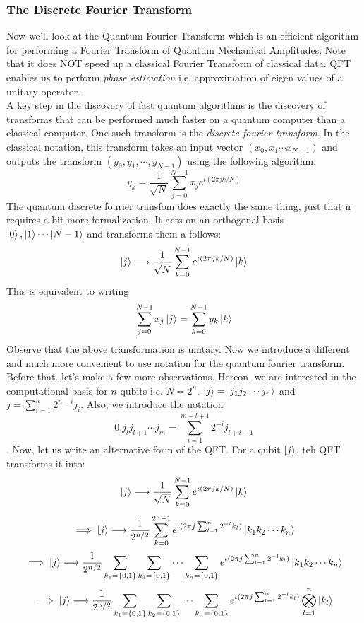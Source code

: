 \documentclass{article}
\begin{document}
\subsubsection{The Discrete Fourier Transform}
Now we'll look at the Quantum Fourier Transform which is an efficient algorithm for performing a Fourier Transform of Quantum Mechanical Amplitudes. Note that it does NOT speed up a classical Fourier Transform of classical data. QFT enables us to perform \emph{phase estimation} i.e. approximation of eigen values of a unitary operator.\\[4pt]
A key step in the discovery of fast quantum algorithms is the discovery of transforms that can be performed much faster on a quantum computer than a classical computer. One such transform is the \emph{discrete fourier transform}. In the classical notation, this transform takes an input vector $(x_0, x_1 \cdots x_{N-1})$ and outputs the transform $(y_0, y_1, \cdots, y_{N-1})$ using the following algorithm:$$y_k = \frac{1}{\sqrt{N}}\sum_{j=0}^{N-1}x_j e^{\iota(2\pi jk/N)}$$
The quantum discrete fourier transfom does exactly the same thing, just that ir requires a bit more formalization. It acts on an orthogonal basis $\ket{0}, \ket{1} \cdots \ket{N-1}$ and transforms them a follows:
$$\ket{j} \longrightarrow  \frac{1}{\sqrt{N}}\sum_{k=0}^{N-1}e^{\iota(2\pi jk/N)}\ket{k}$$
This is equivalent to writing $$\sum_{j=0}^{N-1}x_j\ket{j} = \sum_{k=0}^{N-1}y_k\ket{k}$$
Observe that the above transformation is unitary. Now we introduce a different and much more convenient to use notation for the quantum fourier transform. Before that. let's make a few more observations. Hereon, we are interested in the computational basis for $n$ qubits i.e. $N=2^n$. $\ket{j} = \ket{j_1j_2 \cdots j_n}$ and $j = \sum_{i=1}^n 2^{n-i}j_i$. Also, we introduce the notation $$0.j_lj_{l+1} \cdots j_m = \sum_{i=1}^{m-l+1} 2^{-i}j_{l+i-1}$$. Now, let us write an alternative form of the QFT. For a qubit $\ket{j}$, teh QFT transforms it into:
$$\ket{j} \longrightarrow  \frac{1}{\sqrt{N}}\sum_{k=0}^{N-1}e^{\iota(2\pi jk/N)}\ket{k}$$
$$\implies \ket{j} \longrightarrow  \frac{1}{2^{n/2}}\sum_{k=0}^{2^n-1}e^{\iota(2\pi j\sum_{l=1}^n 2^{-l}k_l)}\ket{k_1k_2 \cdots k_n}$$
$$\implies \ket{j} \longrightarrow  \frac{1}{2^{n/2}}\sum_{k_1=\{0, 1\}}\sum_{k_2=\{0, 1\}} \cdots \sum_{k_n=\{0, 1\}}e^{\iota(2\pi j\sum_{l=1}^n 2^{-l}k_l)}\ket{k_1k_2 \cdots k_n}$$
$$\implies \ket{j} \longrightarrow  \frac{1}{2^{n/2}}\sum_{k_1=\{0, 1\}}\sum_{k_2=\{0, 1\}} \cdots \sum_{k_n=\{0, 1\}}e^{\iota(2\pi j\sum_{l=1}^n 2^{-l}k_l)} \bigotimes_{l=1}^n \ket{k_l}$$
\end{document}
